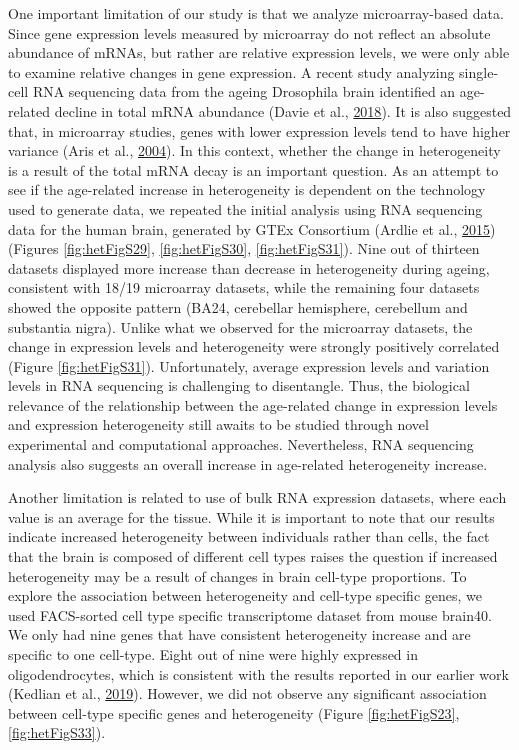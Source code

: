 \documentclass[12pt,twoside]{unicam}
\begin{document}
One important limitation of our study is that we analyze microarray-based data. Since gene expression levels measured by microarray do not reflect an absolute abundance of mRNAs, but rather are relative expression levels, we were only able to examine relative changes in gene expression. A recent study analyzing single-cell RNA sequencing data from the ageing Drosophila brain identified an age-related decline in total mRNA abundance (Davie et al., \protect\hyperlink{ref-Davie2018}{2018}). It is also suggested that, in microarray studies, genes with lower expression levels tend to have higher variance (Aris et al., \protect\hyperlink{ref-Aris2004}{2004}). In this context, whether the change in heterogeneity is a result of the total mRNA decay is an important question. As an attempt to see if the age-related increase in heterogeneity is dependent on the technology used to generate data, we repeated the initial analysis using RNA sequencing data for the human brain, generated by GTEx Consortium (Ardlie et al., \protect\hyperlink{ref-Ardlie2015}{2015}) (Figures \ref{fig:hetFigS29}, \ref{fig:hetFigS30}, \ref{fig:hetFigS31}). Nine out of thirteen datasets displayed more increase than decrease in heterogeneity during ageing, consistent with 18/19 microarray datasets, while the remaining four datasets showed the opposite pattern (BA24, cerebellar hemisphere, cerebellum and substantia nigra). Unlike what we observed for the microarray datasets, the change in expression levels and heterogeneity were strongly positively correlated (Figure \ref{fig:hetFigS31}). Unfortunately, average expression levels and variation levels in RNA sequencing is challenging to disentangle. Thus, the biological relevance of the relationship between the age-related change in expression levels and expression heterogeneity still awaits to be studied through novel experimental and computational approaches. Nevertheless, RNA sequencing analysis also suggests an overall increase in age-related heterogeneity increase.

Another limitation is related to use of bulk RNA expression datasets, where each value is an average for the tissue. While it is important to note that our results indicate increased heterogeneity between individuals rather than cells, the fact that the brain is composed of different cell types raises the question if increased heterogeneity may be a result of changes in brain cell-type proportions. To explore the association between heterogeneity and cell-type specific genes, we used FACS-sorted cell type specific transcriptome dataset from mouse brain40. We only had nine genes that have consistent heterogeneity increase and are specific to one cell-type. Eight out of nine were highly expressed in oligodendrocytes, which is consistent with the results reported in our earlier work (Kedlian et al., \protect\hyperlink{ref-Kedlian2019}{2019}). However, we did not observe any significant association between cell-type specific genes and heterogeneity (Figure \ref{fig:hetFigS23}, \ref{fig:hetFigS33}).
\end{document}
